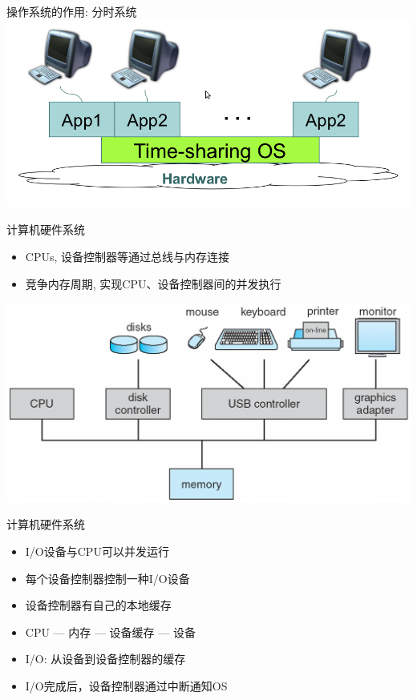 \documentclass[xcolor=svgnames]{beamer}
\begin{document}
\begin{CJK*}{UTF8}{gbsn}
\begin{frame}{操作系统的作用: 分时系统}
\includegraphics[width=1.0\textwidth]{timesharing.png}
\end{frame}

\begin{frame}{计算机硬件系统}
\begin{itemize}
\item CPUs, 设备控制器等通过总线与内存连接
\item 竞争内存周期, 实现CPU、设备控制器间的并发执行
\end{itemize}
\includegraphics[width=1.0\textwidth]{org.png}
\end{frame}

\begin{frame}{计算机硬件系统}
\begin{itemize}
\item I/O设备与CPU可以并发运行
\item 每个设备控制器控制一种I/O设备
\item 设备控制器有自己的本地缓存
\item CPU --- 内存 --- 设备缓存 --- 设备
\item I/O: 从设备到设备控制器的缓存
\item I/O完成后，设备控制器通过\alert{中断}通知OS
\end{itemize}
\end{frame}


\end{CJK*}
\end{document}
